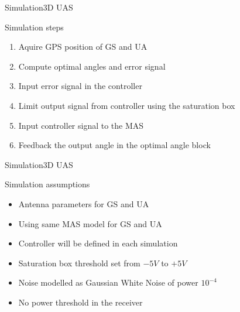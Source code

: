 \begin{frame}{Simulation}{3D UAS}
  \begin{block}{Simulation steps}
	  \begin{enumerate}
	  	\item Aquire GPS position of GS and UA 
	  	\item Compute optimal angles and error signal 
	  	\item Input error signal in the controller
	  	\item Limit output signal from controller using the saturation box
	  	\item Input controller signal to the MAS
	  	\item Feedback the output angle in the optimal angle block
	  \end{enumerate}
  \end{block}
\end{frame}

\begin{frame}{Simulation}{3D UAS}
  \begin{block}{Simulation assumptions}
	  \begin{itemize}
	  	\item Antenna parameters for GS and UA
	  	\item Using same MAS model for GS and UA
	  	\item Controller will be defined in each simulation
	  	\item Saturation box threshold set from $-5V$ to $+5V$
	  	\item Noise modelled as Gaussian White Noise of power $10^{-4}$
	  	\item No power threshold in the receiver
	  \end{itemize}
  \end{block}
\end{frame}